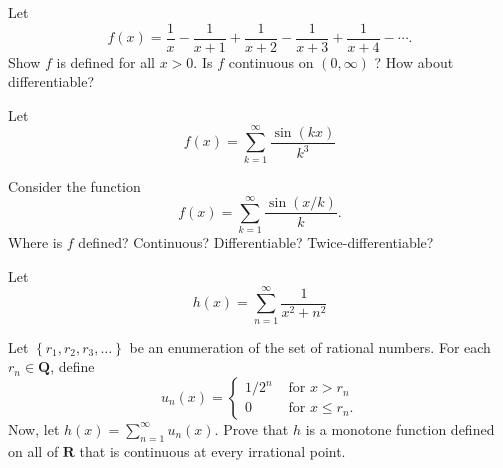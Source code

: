 \begin{exercise}
  Let
  $$
  f(x)=\frac{1}{x}-\frac{1}{x+1}+\frac{1}{x+2}-\frac{1}{x+3}+\frac{1}{x+4}-\cdots .
  $$
  Show $f$ is defined for all $x>0$. Is $f$ continuous on $(0, \infty)$ ? How about differentiable?
\end{exercise}
\begin{solution}
  \TODO
\end{solution}
\begin{exercise}
  Let
  $$
  f(x)=\sum_{k=1}^{\infty} \frac{\sin (k x)}{k^{3}}
  $$
\end{exercise}
\begin{solution}
  \TODO
\end{solution}
\begin{exercise}
  Consider the function
  $$
  f(x)=\sum_{k=1}^{\infty} \frac{\sin (x / k)}{k} .
  $$
  Where is $f$ defined? Continuous? Differentiable? Twice-differentiable?
\end{exercise}
\begin{solution}
  \TODO
\end{solution}
\begin{exercise}
  Let
  $$
  h(x)=\sum_{n=1}^{\infty} \frac{1}{x^{2}+n^{2}}
  $$
\end{exercise}
\begin{solution}
  \TODO
\end{solution}
\begin{exercise}
  Let $\left\{r_{1}, r_{2}, r_{3}, \ldots\right\}$ be an enumeration of the set of rational numbers. For each $r_{n} \in \mathbf{Q}$, define
  $$
  u_{n}(x)= \begin{cases}1 / 2^{n} & \text { for } x>r_{n} \\ 0 & \text { for } x \leq r_{n} .\end{cases}
  $$
  Now, let $h(x)=\sum_{n=1}^{\infty} u_{n}(x)$. Prove that $h$ is a monotone function defined on all of $\mathbf{R}$ that is continuous at every irrational point.
\end{exercise}
\begin{solution}
  \TODO
\end{solution}
